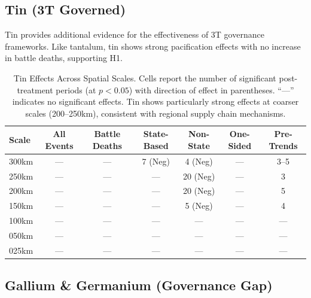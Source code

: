 \documentclass[11pt]{article}
\begin{document}
\subsection{Tin (3T Governed)}

Tin provides additional evidence for the effectiveness of 3T governance frameworks. Like tantalum, tin shows strong pacification effects with no increase in battle deaths, supporting H1.

\begin{table}[H]
\centering
\caption{Tin Effects Across Spatial Scales. Cells report the number of significant post-treatment periods (at $p<0.05$) with direction of effect in parentheses. ``---'' indicates no significant effects. Tin shows particularly strong effects at coarser scales (200--250km), consistent with regional supply chain mechanisms.}
\label{tab:tin_robustness}
\begin{tabular}{lcccccc}
\toprule
Scale & All Events & Battle Deaths & State-Based & Non-State & One-Sided & Pre-Trends \\
\midrule
300km & ---       & ---           & 7 (Neg)     & 4 (Neg)   & ---       & 3--5       \\
250km & ---       & ---           & ---         & 20 (Neg)  & ---       & 3          \\
200km & ---       & ---           & ---         & 20 (Neg)  & ---       & 5          \\
150km & ---       & ---           & ---         & 5 (Neg)   & ---       & 4          \\
100km & ---       & ---           & ---         & ---       & ---       & ---        \\
050km & ---       & ---           & ---         & ---       & ---       & ---        \\
025km & ---       & ---           & ---         & ---       & ---       & ---        \\
\bottomrule
\end{tabular}
\end{table}

\subsection{Gallium \& Germanium (Governance Gap)}




\end{document}
